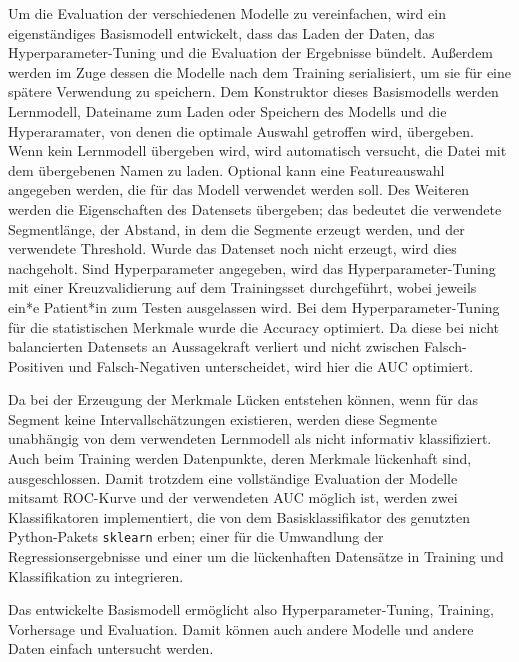 Um die Evaluation der verschiedenen Modelle zu vereinfachen, wird ein eigenständiges Basismodell entwickelt, dass das Laden der Daten, das Hyperparameter-Tuning und die Evaluation der Ergebnisse bündelt.  Außerdem werden im Zuge dessen die Modelle nach dem Training serialisiert, um sie für eine  spätere Verwendung zu speichern. Dem Konstruktor dieses Basismodells werden Lernmodell, Dateiname zum Laden oder Speichern des Modells und die Hyperaramater, von denen die optimale Auswahl getroffen wird, übergeben. Wenn kein Lernmodell übergeben wird, wird automatisch versucht, die Datei mit dem übergebenen Namen zu laden. Optional kann eine Featureauswahl angegeben werden, die für das Modell verwendet werden soll. Des Weiteren werden die Eigenschaften des Datensets übergeben; das bedeutet die verwendete Segmentlänge, der Abstand, in dem die Segmente erzeugt werden, und der verwendete Threshold. Wurde das Datenset noch nicht erzeugt, wird dies nachgeholt. Sind Hyperparameter angegeben, wird das Hyperparameter-Tuning mit einer Kreuzvalidierung auf dem Trainingsset durchgeführt, wobei jeweils ein*e Patient*in zum Testen ausgelassen wird. Bei dem Hyperparameter-Tuning für die statistischen Merkmale wurde die Accuracy optimiert. Da diese bei nicht balancierten Datensets an Aussagekraft verliert und nicht zwischen Falsch-Positiven und Falsch-Negativen unterscheidet, wird hier die \ac{AUC} optimiert.

Da bei der Erzeugung der Merkmale Lücken entstehen können, wenn für das Segment keine Intervallschätzungen existieren, werden diese Segmente unabhängig von dem verwendeten Lernmodell als nicht informativ klassifiziert. Auch beim Training werden Datenpunkte, deren Merkmale lückenhaft sind, ausgeschlossen. Damit trotzdem eine vollständige Evaluation der Modelle mitsamt \ac{ROC}-Kurve und der verwendeten \ac{AUC} möglich ist, werden zwei Klassifikatoren implementiert, die von dem Basisklassifikator des genutzten Python-Pakets \texttt{sklearn} erben; einer für die Umwandlung der Regressionsergebnisse und einer um die lückenhaften Datensätze in Training und Klassifikation zu integrieren.


Das entwickelte Basismodell ermöglicht also Hyperparameter-Tuning, Training, Vorhersage und Evaluation. Damit können auch andere Modelle und andere Daten einfach untersucht werden.





